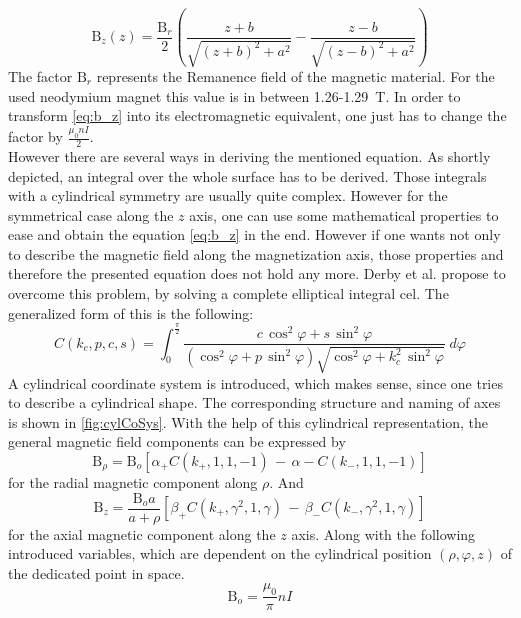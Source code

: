 \begin{equation} \label{eq:b_z}
\mathrm{B}_{z}(z) = \frac{\mathrm{B}_r}{2} \left ( \frac{z + b}{\sqrt{(z + b)^2 + a^2}} - \frac{z - b}{\sqrt{(z - b)^2 + a^2}} \right)
\end{equation}
The factor $ \mathrm{B}_r $ represents the Remanence field of the magnetic material. For the used neodymium magnet this value is in between 1.26-\SI{1.29}{\tesla}. In order to transform \ref{eq:b_z} into its electromagnetic equivalent, one just has to change the factor by $ \frac{\mu_{0} n I}{2} $.\\
However there are several ways in deriving the mentioned equation. As shortly depicted, an integral over the whole surface has to be derived. Those integrals with a cylindrical symmetry are usually quite complex. However for the symmetrical case along the $ z $ axis, one can use some mathematical properties to ease and obtain the equation \ref{eq:b_z} in the end. However if one wants not only to describe the magnetic field along the magnetization axis, those properties and therefore the presented equation does not hold any more. Derby et al. propose to overcome this problem, by solving a complete elliptical integral \ac{cel}. The generalized form of this is the following:
\begin{equation}\label{eq:cel}
C(k_{c},p,c,s) = \int_{0}^{\frac{\pi}{2}} \frac{c \, \cos^{2}\varphi + s \, \sin^{2}\varphi}
{(\cos^{2}\varphi + p \, \sin^{2}\varphi)\sqrt{\cos^{2}\varphi + k_{c}^{2} \, \sin^{2}\varphi}} \; d\varphi
\end{equation}
A cylindrical coordinate system is introduced, which makes sense, since one tries to describe a cylindrical shape. The corresponding structure and naming of axes is shown in \ref{fig:cylCoSys}. With the help of this cylindrical representation, the general magnetic field components can be expressed by
\begin{equation} \label{eq:cylB_rho}
\mathrm{B}_{\rho} = \mathrm{B}_{o}[\alpha_{+} C(k_{+},1,1,-1) \, - \, \alpha{-} C(k_{-},1,1,-1)]
\end{equation}
for the radial magnetic component along $ \rho $. And
\begin{equation} \label{eq:cylB_z}
\mathrm{B}_{z} = \frac{\mathrm{B}_{o}a}{a+\rho}[\beta_{+} C(k_{+},\gamma^2,1,\gamma) \, - \, \beta_{-} C(k_{-},\gamma^2,1,\gamma)]
\end{equation}
for the axial magnetic component along the $ z $ axis. Along with the following introduced variables, which are dependent on the cylindrical position $ (\rho, \varphi, z) $ of the dedicated point in space.
\begin{equation}
\mathrm{B}_{o} = \frac{\mu_{0}}{\pi}nI
\end{equation}

